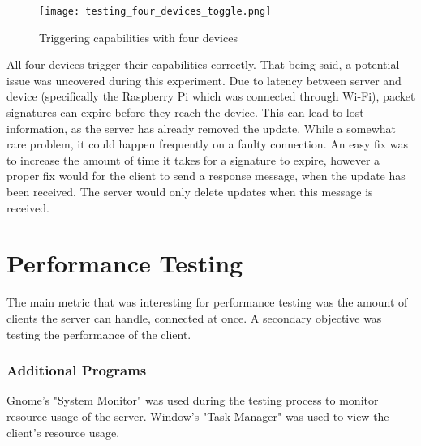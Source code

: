 \begin{figure}[h]
\caption{Triggering capabilities with four devices}
\texttt{[image: testing\_four\_devices\_toggle.png]}
\label{fig:four_connected_device_toggle}
\end{figure}
All four devices trigger their capabilities correctly. That being said, a potential issue was uncovered during this experiment. Due to latency between server and device (specifically the Raspberry Pi which was connected through Wi-Fi), packet signatures can expire before they reach the device. This can lead to lost information, as the server has already removed the update. While a somewhat rare problem, it could happen frequently on a faulty connection. An easy fix was to increase the amount of time it takes for a signature to expire, however a proper fix would for the client to send a response message, when the update has been received. The server would only delete updates when this message is received. 

\section{Performance Testing}
The main metric that was interesting for performance testing was the amount of clients the server can handle, connected at once. A secondary objective was testing the performance of the client.

\subsubsection{Additional Programs}
Gnome's "System Monitor" was used during the testing process to monitor resource usage of the server. Window's "Task Manager" was used to view the client's resource usage.


